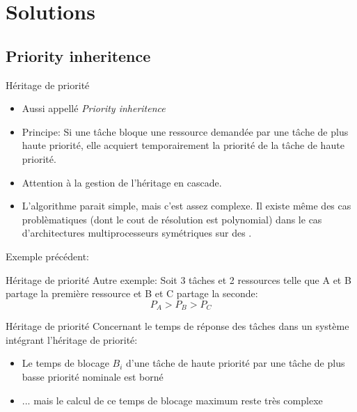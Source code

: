\section{Solutions}

\subsection{Priority inheritence}

\begin{frame}{Héritage de priorité}
  \begin{itemize} 
  \item Aussi appellé \emph{Priority inheritence}
  \item Principe: Si  une tâche bloque une ressource  demandée par une
    tâche  de plus  haute  priorité, elle  acquiert temporairement  la
    priorité de la tâche de haute priorité.
  \item Attention à la gestion de l'héritage en cascade.
  \item  L'algorithme parait  simple,  mais c'est  assez complexe.  Il
    existe même des cas problèmatiques (dont le cout de résolution est
    polynomial)   dans   le   cas   d'architectures   multiprocesseurs
    symétriques sur des .
  \end{itemize} 
  Exemple précédent:
  \begin{center}
    
  \end{center}
\end{frame} 

\begin{frame}{Héritage de priorité}
  Autre exemple:
  Soit 3 tâches et 2 ressources telle que A et B partage la première ressource et B et C partage la seconde:
  $$P_A > P_B > P_C$$
  \begin{center}
    
  \end{center}
\end{frame} 

\begin{frame}{Héritage de priorité} 
  Concernant le temps de réponse  des tâches dans un système intégrant
  l'héritage de priorité:
  \begin{itemize}
  \item Le  temps de blocage $B_i$  d'une tâche de  haute priorité par
    une tâche de plus basse priorité nominale est borné
  \item ...  mais le calcul de  ce temps de blocage maximum reste très
    complexe
  \end{itemize}
\end{frame}

